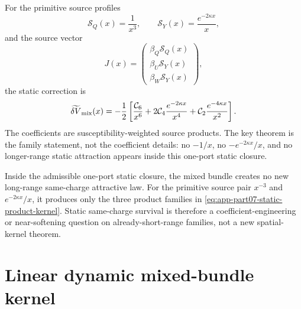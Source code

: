For the primitive source profiles
\begin{equation}
\label{eq:app-part07-primitive-sources}
\mathcal S_Q(x)=\frac1{x^3},
\qquad
\mathcal S_Y(x)=\frac{e^{-2\kappa x}}{x},
\end{equation}
and the source vector
\begin{equation}
\label{eq:app-part07-primitive-source-vector}
J(x)=
\begin{pmatrix}
\beta_Q\mathcal S_Q(x)\\
\beta_U\mathcal S_Y(x)\\
\beta_W\mathcal S_Y(x)
\end{pmatrix},
\end{equation}
the static correction is
\begin{equation}
\label{eq:app-part07-static-product-kernel}
\widetilde{\delta V}_{\rm mix}(x)
=-\frac12\left[
\frac{\mathcal C_6}{x^6}
+2\mathcal C_4\frac{e^{-2\kappa x}}{x^4}
+\mathcal C_2\frac{e^{-4\kappa x}}{x^2}
\right].
\end{equation}
The coefficients are susceptibility-weighted source products.  The key theorem is the family statement, not the coefficient details: no \(-1/x\), no \(-e^{-2\kappa x}/x\), and no longer-range static attraction appears inside this one-port static closure.

\begin{theorem}
\label{thm:app-part07-static-square-law}
Inside the admissible one-port static closure, the mixed bundle creates no new long-range same-charge attractive law.  For the primitive source pair \(x^{-3}\) and \(e^{-2\kappa x}/x\), it produces only the three product families in \cref{eq:app-part07-static-product-kernel}.  Static same-charge survival is therefore a coefficient-engineering or near-softening question on already-short-range families, not a new spatial-kernel theorem.
\end{theorem}


\section{Linear dynamic mixed-bundle kernel}
\label{sec:app-part07_same_charge_rigid_mouth:linear-dynamic-mixed-bundle-kernel}


